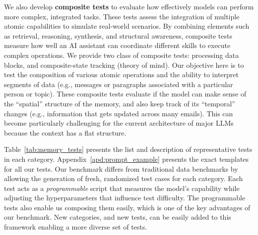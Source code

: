 We also develop \textbf{composite tests} to evaluate how effectively models can perform more complex, integrated tasks. These tests assess the integration of multiple atomic capabilities to simulate real-world scenarios. By combining elements such as retrieval, reasoning, synthesis, and structural awareness, composite tests measure how well an AI assistant can coordinate different skills to execute complex operations. We provide two class of composite tests: processing data blocks, and composite-state tracking (theory of mind). Our objective here is to test the composition of various atomic operations and the ability to interpret segments of data (e.g., messages or paragraphs associated with a particular person or topic). These composite tests evaluate if the model can make sense of the ``spatial'' structure of the memory, and also keep track of its ``temporal'' changes (e.g., information that gets updated across many emails). This can become particularly challenging for the current architecture of major LLMs because the context has a flat structure. 



Table~\ref{tab:memory_tests} presents the list and description of representative tests in each category. Appendix~\ref{apd:prompt_example} presents the exact templates for all our tests. Our benchmark differs from traditional data benchmarks by allowing the generation of fresh, randomized test cases for each category. Each test acts as a \textit{programmable} script that measures the model’s capability while adjusting the hyperparameters that influence test difficulty. The programmable tests also enable us composing them easily, which is one of the key advantages of our benchmark. New categories, and new tests, can be easily added to this framework enabling a more diverse set of tests. 






